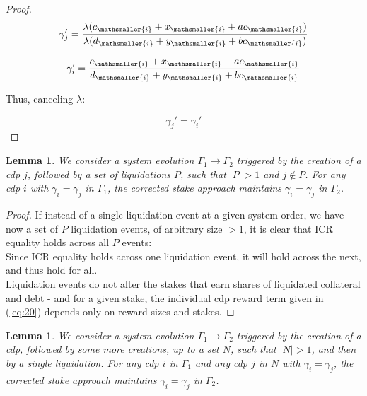 \documentclass[reqno]{article}
\newtheorem{lemma}[theorem]{Lemma}
\begin{document}
\begin{proof}
\begin{equation} 
    \gamma_{j}'=\frac{\lambda(c_\mathsmaller{i} + x_\mathsmaller{i}+ac_\mathsmaller{i})}{\lambda(d_\mathsmaller{i}+y_\mathsmaller{i}+bc_\mathsmaller{i})}
\end{equation}

\begin{equation} 
    \gamma_{i}'=\frac{c_\mathsmaller{i}+x_\mathsmaller{i}+ac_\mathsmaller{i}}{d_\mathsmaller{i}+y_\mathsmaller{i}+bc_\mathsmaller{i}}
\end{equation}

\bigskip
Thus, canceling $\lambda$:

\begin{equation} 
    \gamma_{j}'=\gamma_{i}'
\end{equation}

\end{proof}

\begin{lemma} \label{result:2} We consider a system evolution $\Gamma_1 \rightarrow \Gamma_2$ triggered by the creation of a cdp $j$, followed by a set of liquidations $P$, such that $|P| > 1$ and $j \notin P$. For any cdp $i$ with $\gamma_i = \gamma_j$ in $\Gamma_1$, the corrected stake approach maintains $\gamma_i = \gamma_j$ in $\Gamma_2$.
\end{lemma}

\begin{proof}
If instead of a single liquidation event at a given system order, we have now a set of $P$ liquidation events, of arbitrary size $> 1$, it is clear that ICR equality holds across all $P$ events:\\

Since ICR equality holds across one liquidation event, it will hold across the next, and thus hold for all.\\

Liquidation events do not alter the stakes that earn shares of liquidated collateral and debt - and for a given stake, the individual cdp reward term given in (\ref{eq:20}) depends only on reward sizes and stakes.
\end{proof}

\begin{lemma} \label{result:3}
  We consider a system evolution $\Gamma_1 \rightarrow \Gamma_2$ triggered by the creation of a cdp, followed by some more creations, up to a set $N$, such that $|N| > 1$, and then by a single liquidation. For any cdp $i$ in $\Gamma_1$ and any cdp $j$ in $N$ with $\gamma_i = \gamma_j$, the corrected stake approach maintains $\gamma_i = \gamma_j$ in $\Gamma_2$.
\end{lemma}
\end{document}
